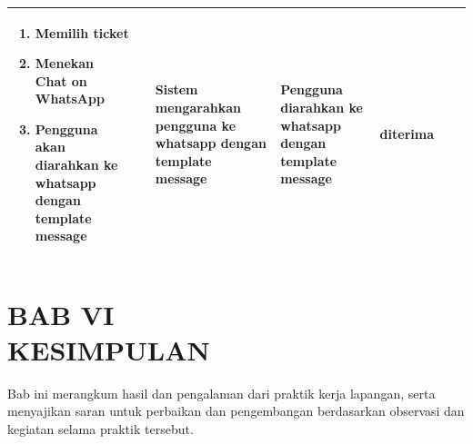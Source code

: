 \documentclass[12pt]{article}
\begin{document}
\begin{enumerate}[label=\textbf{5.\arabic*.}]
\begin{enumerate}[label=\textbf{5.2.\arabic*.}]
\begin{landscape}
\begin{longtable}{ |l|p{}|p{}|p{}|p{}|p{}|l| }
\begin{enumerate}[label=\arabic*.]
                    \item Memilih ticket
                    \item Menekan Chat on WhatsApp
                    \item Pengguna akan diarahkan ke whatsapp dengan template message
                \end{enumerate} 
                &  & Sistem mengarahkan pengguna ke whatsapp dengan template message
                & Pengguna diarahkan ke whatsapp dengan template message & diterima \\
                \hline

                \hline
    
            \end{longtable}
            
            \restoregeometry
        \end{landscape}
    \end{enumerate}

\end{enumerate}

\newpage

\section[BAB VI KESIMPULAN]{BAB VI\\KESIMPULAN}

\setcounter{table}{0}
\setcounter{figure}{0}

Bab ini merangkum hasil dan pengalaman dari praktik kerja lapangan, serta menyajikan saran untuk perbaikan dan pengembangan berdasarkan observasi dan kegiatan selama praktik tersebut.
\end{document}
